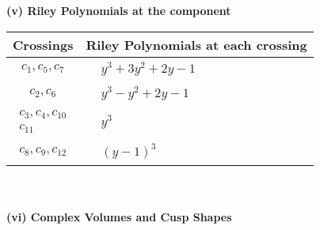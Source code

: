 \documentclass[1p]{elsarticle_modified}
\theoremstyle{definition}
\begin{document}
\newpage\renewcommand{\arraystretch}{1}
\flushleft \textbf{(v) Riley Polynomials at the component}\newline \\
\begin{tabular}{m{50pt}|m{274pt}}
Crossings & \hspace{64pt}Riley Polynomials at each crossing \\
\hline $$\begin{aligned}c_{1},c_{5},c_{7}\end{aligned}$$&$\begin{aligned}
&y^3+3 y^2+2 y-1
\end{aligned}$\\
\hline $$\begin{aligned}c_{2},c_{6}\end{aligned}$$&$\begin{aligned}
&y^3- y^2+2 y-1
\end{aligned}$\\
\hline $$\begin{aligned}c_{3},c_{4},c_{10}\\c_{11}\end{aligned}$$&$\begin{aligned}
&y^3
\end{aligned}$\\
\hline $$\begin{aligned}c_{8},c_{9},c_{12}\end{aligned}$$&$\begin{aligned}
&(y-1)^3
\end{aligned}$\\
\hline
\end{tabular}\\~\\
\newpage\flushleft \textbf{(vi) Complex Volumes and Cusp Shapes}
\end{document}
